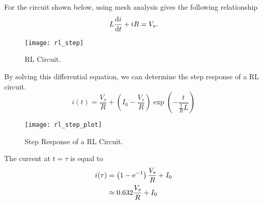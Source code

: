 \documentclass{article}
\begin{document}
\begin{definition}
    For the circuit shown below, using mesh analysis gives the following relationship
    \begin{equation*}
        L\dv{i}{t} + iR = V_s.
    \end{equation*}
    \begin{figure}[H]
        \centering
        \texttt{[image: rl\_step]}
        \caption{RL Circuit.}
    \end{figure}
    By solving this differential equation, we can determine the step response of a 
    RL circuit.
    \begin{equation*}
        i(t) = \frac{V_s}{R} + \left(I_0 - \frac{V_s}{R}\right)\exp{\left( -\frac{t}{\frac{1}{R}L} \right)}
    \end{equation*} 
    \begin{figure}[H]
        \centering
        \texttt{[image: rl\_step\_plot]}
        \caption{Step Response of a RL Circuit.}
    \end{figure}
    The current at $t=\tau$ is equal to
    \begin{align*}
        i(\tau) &= \left( 1 - \mathrm{e}^{-1} \right)\frac{V_s}{R} + I_0 \\
        &\approx 0.632\frac{V_s}{R} + I_0
    \end{align*} 
\end{definition}
\newpage
\end{document}
